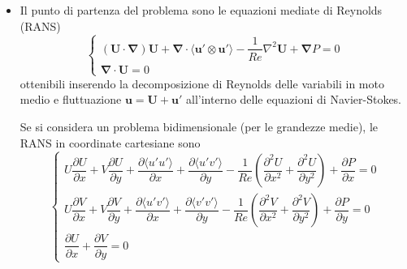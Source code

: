 \parttwo
\begin{itemize}
\item Il punto di partenza del problema sono le equazioni mediate di
 Reynolds (RANS)
 \begin{equation}
  \begin{cases}
   (\bm{U} \cdot \bm{\nabla}) \bm{U}
  + \bm{\nabla} \cdot \langle \bm{u}' \otimes \bm{u}'  \rangle
  - \dfrac{1}{Re} \nabla^2 \bm{U} + \bm{\nabla} P = 0   \\
   \bm{\nabla} \cdot \bm{U} = 0
  \end{cases}
 \end{equation}
 ottenibili inserendo la decomposizione di Reynolds delle variabili in
 moto medio e fluttuazione $\bm{u} = \bm{U} + \bm{u}'$ all'interno delle
 equazioni di Navier-Stokes.

 Se si considera un problema bidimensionale (per le grandezze medie),
  le RANS in coordinate cartesiane sono
 \begin{equation}
 \begin{cases}
U \dfrac{\partial U}{\partial x} + V \dfrac{\partial U}{\partial y} 
+ \dfrac{\partial \langle u'u' \rangle}{\partial x}  
+ \dfrac{\partial \langle u'v' \rangle}{\partial y}  
- \dfrac{1}{Re} \left( \dfrac{\partial^2 U }{\partial x^2} 
                    +  \dfrac{\partial^2 U }{\partial y^2} \right)
+\dfrac{\partial P}{\partial x} = 0 \\
U \dfrac{\partial V}{\partial x} + V \dfrac{\partial V}{\partial y} 
+ \dfrac{\partial \langle u'v' \rangle}{\partial x}  
+ \dfrac{\partial \langle v'v' \rangle}{\partial y}  
- \dfrac{1}{Re} \left( \dfrac{\partial^2 V }{\partial x^2} 
                    +  \dfrac{\partial^2 V }{\partial y^2} \right)
+\dfrac{\partial P}{\partial y} = 0 \\
\dfrac{\partial U}{\partial x} + \dfrac{\partial V}{\partial y} = 0 
 \end{cases}
 \end{equation}


\end{itemize}
